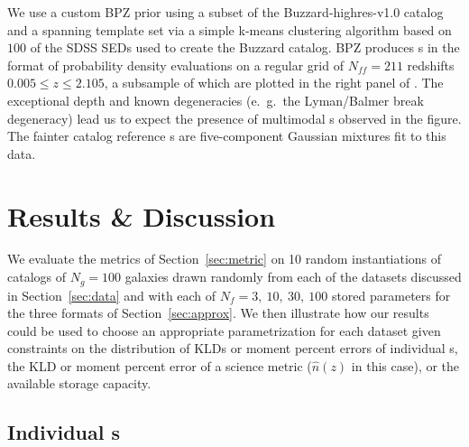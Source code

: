 We use a custom BPZ prior using a subset of the Buzzard-highres-v1.0 catalog 
and a spanning template set via a simple k-means clustering algorithm based on 
$100$ of the SDSS SEDs used to create the Buzzard catalog.
BPZ produces \pz s in the format of probability density evaluations on a 
regular grid of $N_{ff}=211$ redshifts $0.005\leq z\leq2.105$, a subsample of 
which are plotted in the right panel of .
The exceptional depth and known degeneracies (e.~g.~the Lyman/Balmer break 
degeneracy) lead us to expect the presence of multimodal \pz s observed in the 
figure.
The fainter catalog reference \pz s are five-component Gaussian mixtures fit to 
this data.


\section{Results \& Discussion}

We evaluate the metrics of Section~\ref{sec:metric} on 10 random instantiations 
of catalogs of $N_{g}=100$ galaxies drawn randomly from each of the datasets 
discussed in Section~\ref{sec:data} and with each of $N_{f}=3,\ 10,\ 30,\ 100$ 
stored parameters for the three formats of Section~\ref{sec:approx}.
We then illustrate how our results could be used to choose an appropriate 
parametrization for each dataset given constraints on the distribution of KLDs 
or moment percent errors of individual \pz s, the KLD or moment percent error 
of a science metric ($\hat{n}(z)$ in this case), or the available storage 
capacity.


\subsection{Individual \pz s}

